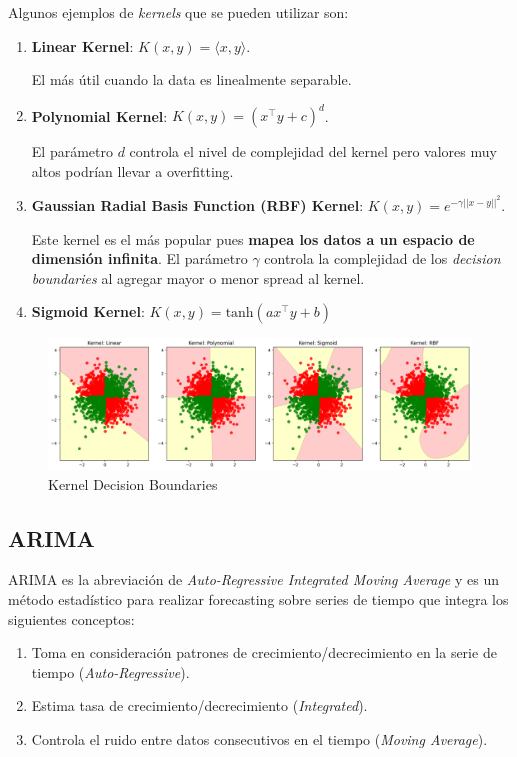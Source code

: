 Algunos ejemplos de \textit{kernels} que se pueden utilizar son: 

\begin{enumerate}
    \item \textbf{Linear Kernel}: $K(x,y) = \langle x , y \rangle$. 
    
    El más útil cuando la data es linealmente separable. 
    \item \textbf{Polynomial Kernel}: $K(x,y) = (x^{\top}y + c)^d$. 
    
    El parámetro $d$ controla el nivel de complejidad del kernel pero valores muy altos podrían llevar a overfitting.
    \item \textbf{Gaussian Radial Basis Function (RBF) Kernel}: $K(x,y) = e^{-\gamma||x-y||^2}$. 
    
    Este kernel es el más popular pues \textbf{mapea los datos a un espacio de dimensión infinita}. El parámetro $\gamma$ controla la complejidad de los \textit{decision boundaries} al agregar mayor o menor spread al kernel. 
    \item \textbf{Sigmoid Kernel}: $K(x,y) = \text{tanh}(ax^{\top}y + b)$
\end{enumerate}

\begin{figure}[H]
    \center
    \includegraphics[scale=0.35]{notebooks/ML/img/kernel_decision_boundaries.png}
    \caption{Kernel Decision Boundaries}
\end{figure}

\subsection{ARIMA}

ARIMA es la abreviación de \textit{Auto-Regressive Integrated Moving Average} y es un método estadístico para realizar forecasting sobre series de tiempo que integra los siguientes conceptos:

\begin{enumerate}
    \item Toma en consideración patrones de crecimiento/decrecimiento en la serie de tiempo (\textit{Auto-Regressive}). 
    \item Estima tasa de crecimiento/decrecimiento (\textit{Integrated}).
    \item Controla el ruido entre datos consecutivos en el tiempo (\textit{Moving Average}).
\end{enumerate}

